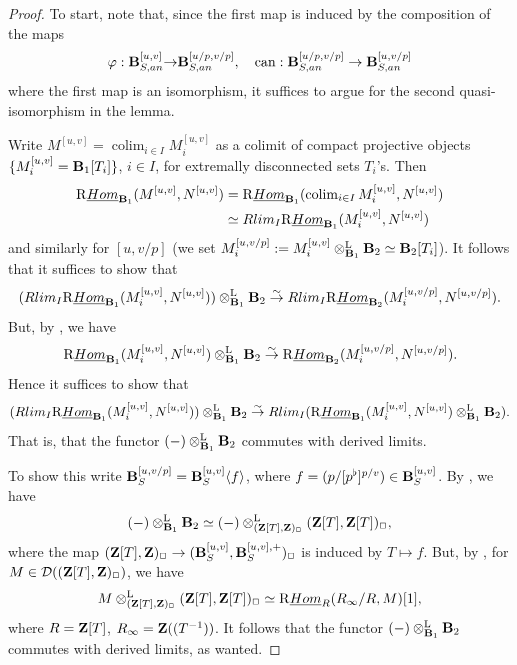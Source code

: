 \documentclass[10pt,reqno]{amsart}
\theoremstyle{definition}
\theoremstyle{remark}
\def\phi{\varphi}
\newcommand{\colim}{\operatorname{colim} }
\newcommand{\uHom}{\underline{{\rm{Hom}} }}
\newcommand{\can}{ \operatorname{can} }
\newcommand{\LL}{\operatorname{L} }
\newcommand{\sd}{{\mathcal{D}}}
\numberwithin{equation}{section}
\def\R{{\mathrm R}}
\numberwithin{equation}{section}
\begin{document}
    \begin{proof}To start, note that, since the first map is induced by the composition of the maps 
$$\phi: \B^{[u,v]}_{S,{\rm an}}{\to }\B^{[u/p,v/p]}_{S,{\rm an}},
\quad \can: \B^{[u/p,v/p]}_{S,{\rm an}}\to \B^{[u,v/p]}_{S,{\rm an}}$$ 
where the first map is an isomorphism, it suffices to argue for the second quasi-isomorphism in the lemma.
   
      Write $M^{[u,v]}=\colim_{i\in I} M_{i}^{[u,v]}$ as a  colimit of compact 
projective objects $\{M_{i}^{[u,v]}={\bf B}_1[T_i]\}$, $i\in I$, for extremally disconnected sets $T_i$'s. Then
     \begin{align*}
      \R\uHom_{\B_1}(M^{[u,v]},N^{[u,v]}) &=  
\R\uHom_{\B_1}(\colim_{i\in I} M_{i}^{[u,v]}, N^{[u,v]})\\
       & \simeq {\rm Rlim}_I\R\uHom_{\B_1}( M_{i}^{[u,v]}, N^{[u,v]})
     \end{align*}
     and similarly for $[u,v/p]$ (we set $M_{i}^{[u,v/p]}:=M_{i}^{[u,v]}\otimes^{\LL}_{\B_1}\B_2\simeq \B_2[T_i]$). It follows that it suffices to show that 
     $$
    ( {\rm Rlim}_I\R\uHom_{\B_1}( M_{i}^{[u,v]}, N^{[u,v]}))\otimes^{\LL}_{\B_1}\B_2
\stackrel{\sim}{\to} {\rm Rlim}_I\R\uHom_{\B_2}( M_{i}^{[u,v/p]}, N^{[u,v/p]}).
     $$
     But, by \cite[Prop.\,5.38]{And21}, we have 
     $$
      \R\uHom_{\B_1}( M_{i}^{[u,v]}, N^{[u,v]})\otimes^{\LL}_{\B_1}\B_2
\stackrel{\sim}{\to}\R\uHom_{\B_2}( M_{i}^{[u,v/p]}, N^{[u,v/p]}).
 $$
 Hence it suffices to show that
 $$
     ( {\rm Rlim}_I\R\uHom_{\B_1}( M_{i}^{[u,v]}, N^{[u,v]}))\otimes^{\LL}_{\B_1}\B_2\stackrel{\sim}{\to}
        {\rm Rlim}_I(\R\uHom_{\B_1}( M_{i}^{[u,v]}, N^{[u,v]})\otimes^{\LL}_{\B_1}\B_2).
 $$
 That is, that the functor $(-)\otimes^{\LL}_{\B_1}\B_2$ commutes with derived limits. 
 
   To show this write ${\bf B}_{S}^{[u,v/p]}={\bf B}_{S}^{[u,v]}\langle f\rangle$, where   $f=(p/[p^{\flat}]^{p/v})\in {\bf B}_{S}^{[u,v]}$.
By \cite[Prop.\,4.11]{And21}, we have 
 \begin{align}\label{fun1}
 (-)\otimes^{\LL}_{\B_1}\B_2\simeq (-)\otimes^{\LL}_{(\Z[T],\Z)_{\Box}}(\Z[T],\Z[T])_{\Box},
 \end{align}
 where the map $({\bf Z}[T],{\bf Z})_{\Box}\to ({\bf B}_{S}^{[u,v]},{\bf B}^{[u,v],+}_{S})_{\Box}$ 
is induced by $T\mapsto f$. But, by \cite[Prop.\,3.12]{And21}, for $M\in \sd((\Z[T],\Z)_{\Box})$, we have 
 $$
 M\otimes^{\LL}_{(\Z[T],\Z)_{\Box}}(\Z[T],\Z[T])_{\Box}\simeq \R\uHom_{R}(R_{\infty}/R,M)[1],
 $$ where $R={\bf Z}[T]$, $R_{\infty}={\bf Z}((T^{-1}))$. It follows that the functor $(-)\otimes^{\LL}_{\B_1}\B_2$ commutes with derived limits, as wanted.
    \end{proof}
\end{document}
